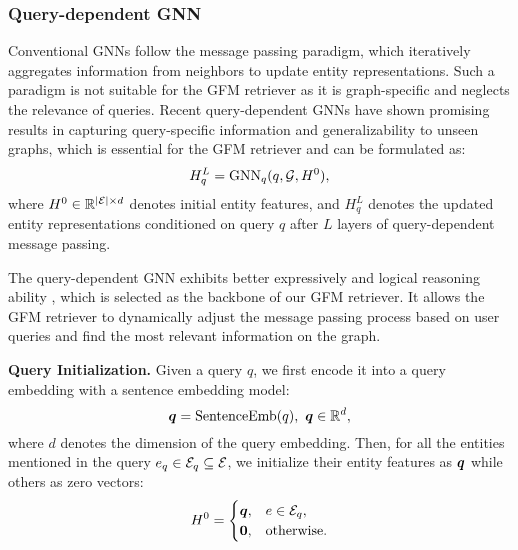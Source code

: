 \subsubsection{Query-dependent GNN}\label{sec:message-passing}
Conventional GNNs \cite{gilmer2017neural} follow the message passing paradigm, which iteratively aggregates information from neighbors to update entity representations. Such a paradigm is not suitable for the GFM retriever as it is graph-specific and neglects the relevance of queries. Recent query-dependent GNNs \cite{zhu2021neural,galkintowards} have shown promising results in capturing query-specific information and generalizability to unseen graphs, which is essential for the GFM retriever and can be formulated as: 
\begin{equation}
    \setlength\abovedisplayskip{2pt}%
    \setlength\belowdisplayskip{2pt}
        H_q^L = \text{GNN}_q(q,\gG,H^0),
\end{equation}
where $H^0\in{\mathbb{R}}^{|{\mathcal{E}}|\times d}$ denotes initial entity features, and $H_q^L$ denotes the updated entity representations conditioned on query $q$ after $L$ layers of query-dependent message passing. 

The query-dependent GNN exhibits better expressively \cite{you2021identity} and logical reasoning ability \cite{qiuunderstanding}, which is selected as the backbone of our GFM retriever. It allows the GFM retriever to dynamically adjust the message passing process based on user queries and find the most relevant information on the graph.

\noindent\textbf{Query Initialization.} Given a query $q$, we first encode it into a query embedding with a sentence embedding model:
\begin{equation}
    \setlength\abovedisplayskip{2pt}%
    \setlength\belowdisplayskip{2pt}
    \vq = \text{SentenceEmb}(q),~\vq\in\mathbb{R}^d,
\end{equation}
where $d$ denotes the dimension of the query embedding. Then, for all the entities mentioned in the query $e_q\in{\mathcal{E}}_q\subseteq{\mathcal{E}}$, we initialize their entity features as ${\bm{q}}$ while others as zero vectors:
\begin{equation}
    \setlength\abovedisplayskip{1pt}%
    \setlength\belowdisplayskip{1pt}
    H^0 = \begin{cases}
        \vq, & e\in\gE_q, \\
        \vzero, & \text{otherwise}.
    \end{cases}
\end{equation}

